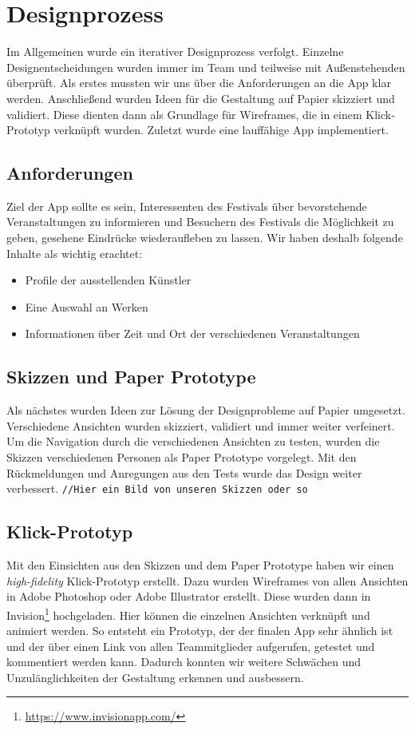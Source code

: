 \section{Designprozess}
Im Allgemeinen wurde ein iterativer Designprozess verfolgt. Einzelne Designentscheidungen wurden immer im Team und teilweise mit Außenstehenden überprüft. Als erstes mussten wir uns über die Anforderungen an die App klar werden. Anschließend wurden Ideen für die Gestaltung auf Papier skizziert und validiert. Diese dienten dann als Grundlage für Wireframes, die in einem Klick-Prototyp verknüpft wurden. Zuletzt wurde eine lauffähige App implementiert. 
\subsection{Anforderungen}
Ziel der App sollte es sein, Interessenten des Festivals über bevorstehende Veranstaltungen zu informieren und Besuchern des Festivals die Möglichkeit zu geben, gesehene Eindrücke wiederaufleben zu lassen. Wir haben deshalb folgende Inhalte als wichtig erachtet:
\begin{itemize}
\itemsep0.5pt
\item Profile der ausstellenden Künstler
\item Eine Auswahl an Werken
\item Informationen über Zeit und Ort der verschiedenen Veranstaltungen
\end{itemize}
\subsection{Skizzen und Paper Prototype}
Als nächstes wurden Ideen zur Lösung der Designprobleme auf Papier umgesetzt. Verschiedene Ansichten wurden skizziert, validiert und immer weiter verfeinert. Um die Navigation durch die verschiedenen Ansichten zu testen, wurden die Skizzen verschiedenen Personen als Paper Prototype vorgelegt. Mit den Rückmeldungen und Anregungen aus den Tests wurde das Design weiter verbessert.
\texttt{//Hier ein Bild von unseren Skizzen oder so}
\subsection{Klick-Prototyp}
Mit den Einsichten aus den Skizzen und dem Paper Prototype haben wir einen \textit{high-fidelity} Klick-Prototyp erstellt. Dazu wurden Wireframes von allen Ansichten in Adobe Photoshop oder Adobe Illustrator erstellt. Diese wurden dann in Invision\footnote{\url{https://www.invisionapp.com/}} hochgeladen. Hier können die einzelnen Ansichten verknüpft und animiert werden. So entsteht ein Prototyp, der der finalen  App sehr ähnlich ist und der über einen Link von allen Teammitglieder aufgerufen, getestet und kommentiert werden kann. Dadurch konnten wir weitere Schwächen und Unzulänglichkeiten der Gestaltung erkennen und ausbessern.
